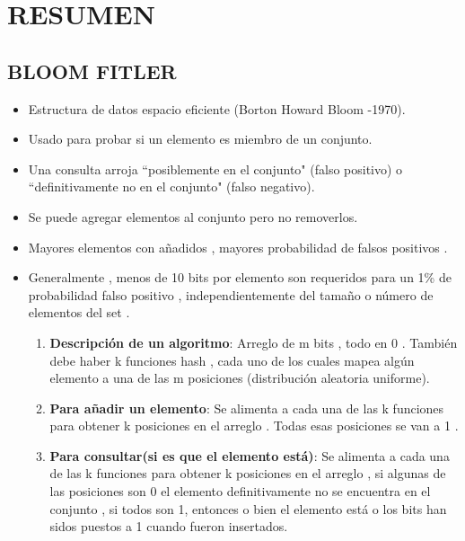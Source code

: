 \documentclass[journal]{IEEEtran}
\begin{document}
\section{RESUMEN}
\subsection{BLOOM FITLER}
\begin{itemize}
    \item Estructura de datos espacio eficiente (Borton Howard Bloom -1970).
    \item Usado para probar si un elemento es miembro de un conjunto.
    \item Una consulta arroja ``posiblemente en el conjunto" (falso positivo)  o ``definitivamente no en el conjunto" (falso negativo).
    \item Se puede agregar elementos al conjunto pero no removerlos.
    \item Mayores elementos con añadidos , mayores probabilidad de falsos positivos .
    \item Generalmente , menos de 10 bits por elemento son requeridos para un 1\% de probabilidad falso positivo , independientemente del tamaño o número de elementos del set .
    \begin{enumerate}
    \item {\bf Descripción de un algoritmo}: Arreglo de m bits , todo en 0 . También debe haber k funciones hash , cada uno de los cuales mapea algún elemento a una de las m posiciones (distribución aleatoria uniforme). 
    \item {\bf Para añadir un elemento}: Se alimenta a cada una de las k funciones para obtener k posiciones en el arreglo . Todas esas posiciones se van a 1 .
    \item {\bf Para consultar(si es que el elemento está)}: Se alimenta a cada una de las k funciones para obtener k posiciones en el arreglo , si algunas de las posiciones son 0 el elemento definitivamente no se encuentra en el conjunto , si todos son 1, entonces o bien el elemento está o los bits han sidos puestos a 1 cuando fueron insertados.
\end{enumerate}

\end{itemize}
\end{document}

